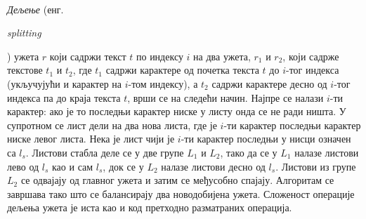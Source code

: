\documentclass[12pt,oneside]{memoir}
\begin{document}
\paragraph{}
\emph{Дељење} (енг. \begin{latinica}\textit{splitting}\end{latinica}) ужета \(r\) који
садржи текст \(t\) по
индексу \(i\) на два ужета, \(r_1\) и \(r_2\), који садрже текстове \(t_1\) и \(t_2\),
где \(t_1\) садржи карактере од почетка текста \(t\) до \(i\)-тог индекса (укључујући и
карактер на \(i\)-том индексу), а \(t_2\) садржи карактере десно од \(i\)-тог индекса па
до краја текста \(t\), врши се на следећи начин. Најпре се налази \(i\)-ти карактер: ако је то последњи карактер ниске у листу онда се не ради ништа. У супротном се лист дели на два нова листа, где је \(i\)-ти карактер последњи
карактер ниске левог листа. Нека је лист чији је \(i\)-ти карактер последњи у нисци
означен са \(l_s\). Листови стабла деле се у две групе \(L_1\) и \(L_2\), тако да се у
\(L_1\) налазе листови лево од \(l_s\) као и сам \(l_s\), док се у \(L_2\) налазе
листови десно од \(l_s\). Листови из групе \(L_2\) се одвајају од главног ужета и затим
се међусобно спајају. Алгоритам се завршава тако што се балансирају два новодобијена
ужета. Сложеност операције дељења ужета је иста као и код претходно разматраних операција. 
\end{document}
